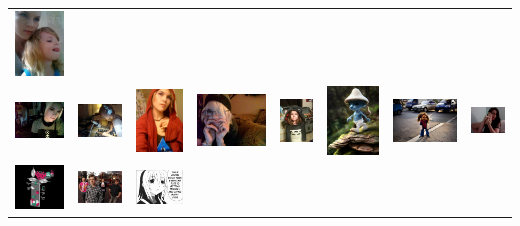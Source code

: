 \documentclass{beamer}
\begin{document}
\begin{frame}
\begin{tabular}{cccccccc}
    \includegraphics[height=.3in,width=.3in,keepaspectratio]{../images/24.jpg} \\
    \includegraphics[height=.3in,width=.3in,keepaspectratio]{../images/25.jpg} &
    \includegraphics[height=.3in,width=.3in,keepaspectratio]{../images/26.jpg} &
    \includegraphics[height=.3in,width=.3in,keepaspectratio]{../images/27.jpg} &
    \includegraphics[height=.3in,width=.3in,keepaspectratio]{../images/28.jpg} &
    \includegraphics[height=.3in,width=.3in,keepaspectratio]{../images/29.jpg} &
    \includegraphics[height=.3in,width=.3in,keepaspectratio]{../images/30.jpg} &
    \includegraphics[height=.3in,width=.3in,keepaspectratio]{../images/31.jpg} &
    \includegraphics[height=.3in,width=.3in,keepaspectratio]{../images/32.jpg} \\
    \includegraphics[height=.3in,width=.3in,keepaspectratio]{../images/33.jpg} &
    \includegraphics[height=.3in,width=.3in,keepaspectratio]{../images/34.jpg} &
    \includegraphics[height=.3in,width=.3in,keepaspectratio]{../images/35.png} &

\end{tabular}
\end{frame}
\end{document}
